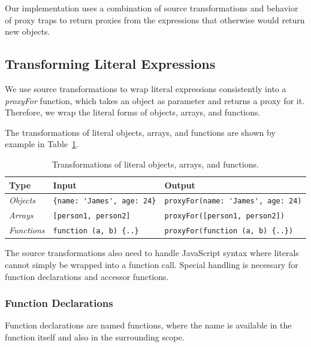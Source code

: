 Our implementation uses a combination of source transformations and behavior of proxy traps to return proxies from the expressions that otherwise would return new objects.




\subsection{Transforming Literal Expressions}

We use source transformations to wrap literal expressions consistently into a \emph{proxyFor} function, which takes an object as parameter and returns a proxy for it.
Therefore, we wrap the literal forms of objects, arrays, and functions.

The transformations of literal objects, arrays, and functions are shown by example in Table~\ref{table:literalTransforms}.

\begin{table}[h]
\begin{center}
\begin{tabular}{| l | l | l |}
\hline
Type & Input & Output \\ \hline
\emph{Objects} & \lstinline|{name: 'James', age: 24}| & \lstinline|proxyFor(name: 'James', age: 24)| \\ \hline
\emph{Arrays} & \lstinline|[person1, person2]| & \lstinline|proxyFor([person1, person2])| \\ \hline
\emph{Functions} & \lstinline|function (a, b) {..}| & \lstinline|proxyFor(function (a, b) {..})| \\ \hline
\end{tabular}
\end{center}
\caption[Table caption text]{Transformations of literal objects, arrays, and functions.}
\label{table:literalTransforms}
\end{table}

The source transformations also need to handle JavaScript syntax where literals cannot simply be wrapped into a function call.
Special handling is necessary for function declarations and accessor functions.


\subsubsection{Function Declarations}

Function declarations are named functions, where the name is available in the function itself and also in the surrounding scope.

